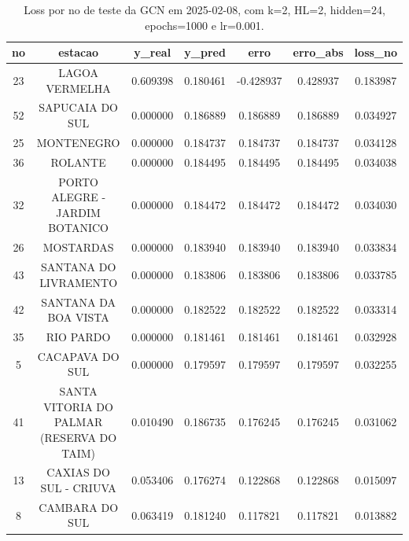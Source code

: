 \begin{table}[h]
\centering
\caption{Loss por no de teste da GCN em 2025-02-08, com k=2, HL=2, hidden=24, epochs=1000 e lr=0.001.}
\label{tab:gcn_loss_k2_hl2_h24_e1000_d20250208}
\begin{tabular}{ccccccc}
\toprule
no & estacao & y\_real & y\_pred & erro & erro\_abs & loss\_no \\
\midrule
23 & LAGOA VERMELHA & 0.609398 & 0.180461 & -0.428937 & 0.428937 & 0.183987 \\
52 & SAPUCAIA DO SUL & 0.000000 & 0.186889 & 0.186889 & 0.186889 & 0.034927 \\
25 & MONTENEGRO & 0.000000 & 0.184737 & 0.184737 & 0.184737 & 0.034128 \\
36 & ROLANTE & 0.000000 & 0.184495 & 0.184495 & 0.184495 & 0.034038 \\
32 & PORTO ALEGRE - JARDIM BOTANICO & 0.000000 & 0.184472 & 0.184472 & 0.184472 & 0.034030 \\
26 & MOSTARDAS & 0.000000 & 0.183940 & 0.183940 & 0.183940 & 0.033834 \\
43 & SANTANA DO LIVRAMENTO & 0.000000 & 0.183806 & 0.183806 & 0.183806 & 0.033785 \\
42 & SANTANA DA BOA VISTA & 0.000000 & 0.182522 & 0.182522 & 0.182522 & 0.033314 \\
35 & RIO PARDO & 0.000000 & 0.181461 & 0.181461 & 0.181461 & 0.032928 \\
5 & CACAPAVA DO SUL & 0.000000 & 0.179597 & 0.179597 & 0.179597 & 0.032255 \\
41 & SANTA VITORIA DO PALMAR (RESERVA DO TAIM) & 0.010490 & 0.186735 & 0.176245 & 0.176245 & 0.031062 \\
13 & CAXIAS DO SUL - CRIUVA & 0.053406 & 0.176274 & 0.122868 & 0.122868 & 0.015097 \\
8 & CAMBARA DO SUL & 0.063419 & 0.181240 & 0.117821 & 0.117821 & 0.013882 \\
\bottomrule
\end{tabular}
\end{table}
